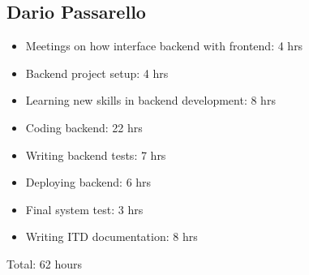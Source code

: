 \subsection{Dario Passarello}
\begin{itemize}
    \item Meetings on how interface backend with frontend: 4 hrs
    \item Backend project setup: 4 hrs
    \item Learning new skills in backend development: 8 hrs
    \item Coding backend: 22 hrs
    \item Writing backend tests: 7 hrs
    \item Deploying backend: 6 hrs
    \item Final system test: 3 hrs
    \item Writing ITD documentation: 8 hrs
\end{itemize}
Total: 62 hours
